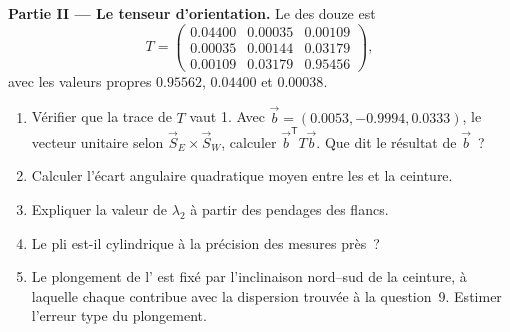 \begin{problem}
\medskip\noindent\textbf{Partie II --- Le tenseur d'orientation.}
Le  des douze  est
\[
  T = \begin{pmatrix} 0.04400 & 0.00035 & 0.00109\\ 0.00035 & 0.00144 & 0.03179\\
  0.00109 & 0.03179 & 0.95456 \end{pmatrix},
\]
avec les valeurs propres $0.95562$, $0.04400$ et $0.00038$.
\begin{enumerate}[resume]
  \item Vérifier que la trace de $T$ vaut 1. Avec $\vec b = (0.0053, -0.9994,
        0.0333)$, le vecteur unitaire selon $\vec S_E\times\vec S_W$, calculer
        $\vec b^{\mathsf T}T\vec b$. Que dit le résultat de $\vec b$~?
  \item Calculer l'écart angulaire quadratique moyen entre les  et la ceinture.
  \item Expliquer la valeur de $\lambda_2$ à partir des pendages des flancs.
  \item Le pli est-il cylindrique à la précision des mesures près~?
  \item Le plongement de l' est fixé par l'inclinaison nord--sud de la
        ceinture, à laquelle chaque  contribue avec la dispersion trouvée à
        la question~9. Estimer l'erreur type du plongement.
\end{enumerate}


\end{problem}
